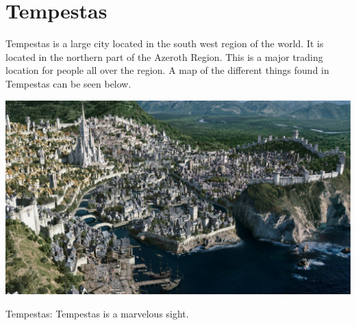 \section{Tempestas}

Tempestas is a large city located in the south west region of the world. It is located in the northern part of the Azeroth Region. This is a major trading location for people all over the region. A map of the different things found in Tempestas can be seen below.

\begin{center}
	\includegraphics[width=\linewidth]{img/1200px-StormwindPanorama.jpg}
	
	{Tempestas: Tempestas is a marvelous sight.}
\end{center}


